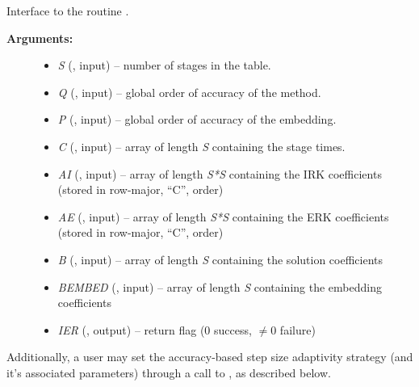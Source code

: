 \documentclass[letterpaper,10pt,english]{sphinxmanual}
\begin{document}
\begin{fulllineitems}
\label{f_interface/Usage:f/_/FARKSETARKTABLES}
Interface to the routine {\hyperref[c_interface/User_callable:ARKodeSetARKTables]{}}.
\begin{description}
\item[{\textbf{Arguments:}}] \leavevmode\begin{itemize}
\item {} 
\emph{S} (, input) -- number of stages in the table.

\item {} 
\emph{Q} (, input) -- global order of accuracy of the method.

\item {} 
\emph{P} (, input) -- global order of accuracy of the embedding.

\item {} 
\emph{C} (, input) -- array of length \emph{S} containing the stage times.

\item {} 
\emph{AI} (, input) -- array of length \emph{S*S} containing the IRK coefficients
(stored in row-major, ``C'', order)

\item {} 
\emph{AE} (, input) -- array of length \emph{S*S} containing the ERK coefficients
(stored in row-major, ``C'', order)

\item {} 
\emph{B} (, input) -- array of length \emph{S} containing the solution coefficients

\item {} 
\emph{BEMBED} (, input) -- array of length \emph{S} containing the embedding
coefficients

\item {} 
\emph{IER} (, output) -- return flag (0 success, $\ne 0$ failure)

\end{itemize}

\end{description}

\end{fulllineitems}


Additionally, a user may set the accuracy-based step size adaptivity
strategy (and it's associated parameters) through a call to
{\hyperref[f_interface/Usage:f/_/FARKSETADAPTIVITYMETHOD]{}}, as described below.
\end{document}
